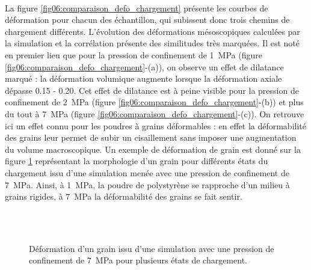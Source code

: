		\\La figure \ref{fig06:comparaison_defo_chargement} présente les courbes de déformation pour chacun des échantillon, qui subissent donc trois chemins de chargement différents. L'évolution des déformations mésoscopiques calculées par la simulation et la corrélation présente des similitudes très marquées. Il est noté en premier lieu que pour la pression de confinement de \SI{1}{\mega\pascal} (figure \ref{fig06:comparaison_defo_chargement}-(a)), on observe un effet de dilatance marqué : la déformation volumique augmente lorsque la déformation axiale dépasse \num{0.15} - \num{0.20}. Cet effet de dilatance est à peine visible pour la pression de confinement de \SI{2}{\mega\pascal} (figure \ref{fig06:comparaison_defo_chargement}-(b)) et plus du tout à \SI{7}{\mega\pascal} (figure \ref{fig06:comparaison_defo_chargement}-(c)). On retrouve ici un effet connu pour les poudres à grains déformables : en effet la déformabilité des grains leur permet de subir un cisaillement sans imposer une augmentation du volume macroscopique. Un exemple de déformation de grain est donné sur la figure \ref{fig06:defo_grain} représentant la morphologie d'un grain pour différents états du chargement issu d'une simulation menée avec une pression de confinement de \SI{7}{\mega\pascal}. Ainsi, à \SI{1}{\mega\pascal}, la poudre de polystyrène se rapproche d'un milieu à grains rigides, à \SI{7}{\mega\pascal} la déformabilité des grains se fait sentir.
		\begin{figure}\centering
			~\hfill
			\hfill
			\hfill~\\
			~\hfill
			\hfill
			\hfill~\\
			\caption{\label{fig06:defo_grain}Déformation d'un grain issu d'une simulation avec une pression de confinement de \SI{7}{\mega\pascal} pour plusieurs états de chargement.}
		\end{figure}
